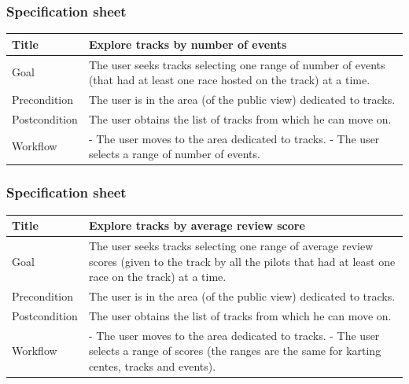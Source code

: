 \documentclass{beamer}
\begin{document}
\begin{frame}
    \frametitle{Specification sheet}
    \begin{table}
        \tiny
        \begin{tabular}{|p{2cm}|p{6cm}|}
        \hline
        Title & \textbf{Explore tracks by number of events} \\
        \hline
        Goal & The user seeks tracks selecting one range of number of events
        (that had at least one race hosted on the track) at a time. \\
        \hline
        Precondition & The user is in the area (of the public view) dedicated to tracks.\\
        \hline
        Postcondition & The user obtains the list of tracks from which he can move on.\\
        \hline
        Workflow &
        - The user moves to the area dedicated to tracks. \newline
        - The user selects a range of number of events. \\
        \hline
        \end{tabular}
\end{table}
\end{frame}

\begin{frame}
    \frametitle{Specification sheet}
    \begin{table}
        \tiny
        \begin{tabular}{|p{2cm}|p{6cm}|}
        \hline
        Title & \textbf{Explore tracks by average review score} \\
        \hline
        Goal & The user seeks tracks selecting one range of average review scores (given to the track by all the pilots
        that had at least one race on the track) at a time. \\
        \hline
        Precondition & The user is in the area (of the public view) dedicated to tracks.\\
        \hline
        Postcondition & The user obtains the list of tracks from which he can move on.\\
        \hline
        Workflow &
        - The user moves to the area dedicated to tracks. \newline
        - The user selects a range of scores (the ranges are the same for karting centes, tracks and events). \\
        \hline
        \end{tabular}
\end{table}
\end{frame}
\end{document}

